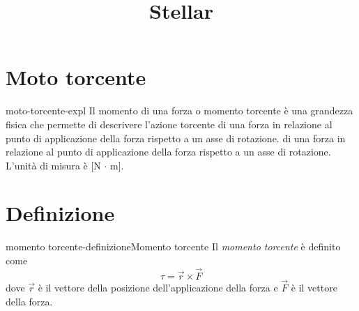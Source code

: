 \documentclass[preview]{standalone}
\begin{document}
\title{Stellar}
\genpage

\section{Moto torcente}

\begin{snippet}{moto-torcente-expl}
    Il momento di una forza o momento torcente è una grandezza fisica che permette di descrivere l'azione torcente di una forza in relazione al punto di applicazione della forza rispetto a un asse di rotazione.
di una forza in relazione al punto di applicazione della forza rispetto a un asse di rotazione.
\\ L'unità di misura è [N \(\cdot\) m].
\end{snippet}

\section{Definizione}

\begin{snippetdefinition}{momento torcente-definizione}{Momento torcente}
    Il \textit{momento torcente} è definito come
    \[ \tau = \vec{r} \times \vec{F} \]
    dove \(\vec{r}\) è il vettore della posizione dell'applicazione della forza
    e \(\vec{F}\) è il vettore della forza.
\end{snippetdefinition}
\end{document}
